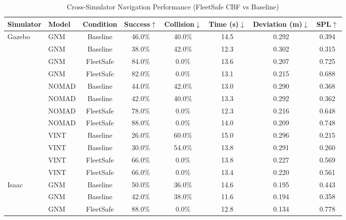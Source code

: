 \begin{table}[t]
\centering
\setlength{\tabcolsep}{4pt}
\caption{Cross-Simulator Navigation Performance (FleetSafe CBF vs Baseline)}
\label{tab:unified_benchmark}
\begin{tabular}{llcccccc}
\toprule
Simulator & Model & Condition & Success$\uparrow$ & Collision$\downarrow$ & Time (s)$\downarrow$ & Deviation (m)$\downarrow$ & SPL$\uparrow$ \\
\midrule
Gazebo & GNM & Baseline & 46.0\% & \textcolor{red!70!black}{40.0\%} & 14.5 & 0.292 & 0.394 \\
 & GNM & Baseline & 38.0\% & \textcolor{red!70!black}{42.0\%} & 12.3 & 0.302 & 0.315 \\
 & GNM & FleetSafe & \textcolor{green!60!black}{84.0\%} & \textcolor{green!60!black}{0.0\%} & 13.6 & 0.207 & 0.725 \\
\addlinespace
 & GNM & FleetSafe & \textcolor{green!60!black}{82.0\%} & \textcolor{green!60!black}{0.0\%} & 13.1 & 0.215 & 0.688 \\
\addlinespace
 & NOMAD & Baseline & 44.0\% & \textcolor{red!70!black}{42.0\%} & 13.0 & 0.290 & 0.368 \\
 & NOMAD & Baseline & 42.0\% & \textcolor{red!70!black}{40.0\%} & 13.3 & 0.292 & 0.362 \\
 & NOMAD & FleetSafe & \textcolor{green!60!black}{78.0\%} & \textcolor{green!60!black}{0.0\%} & 12.3 & 0.216 & 0.648 \\
\addlinespace
 & NOMAD & FleetSafe & \textcolor{green!60!black}{88.0\%} & \textcolor{green!60!black}{0.0\%} & 14.0 & 0.209 & 0.748 \\
\addlinespace
 & VINT & Baseline & 26.0\% & \textcolor{red!70!black}{60.0\%} & 15.0 & 0.296 & 0.215 \\
 & VINT & Baseline & 30.0\% & \textcolor{red!70!black}{54.0\%} & 13.8 & 0.291 & 0.260 \\
 & VINT & FleetSafe & \textcolor{green!60!black}{66.0\%} & \textcolor{green!60!black}{0.0\%} & 13.8 & 0.227 & 0.569 \\
\addlinespace
 & VINT & FleetSafe & \textcolor{green!60!black}{66.0\%} & \textcolor{green!60!black}{0.0\%} & 13.4 & 0.220 & 0.561 \\
\addlinespace
Isaac & GNM & Baseline & 50.0\% & \textcolor{red!70!black}{36.0\%} & 14.6 & 0.195 & 0.443 \\
 & GNM & Baseline & 42.0\% & \textcolor{red!70!black}{38.0\%} & 11.6 & 0.194 & 0.358 \\
 & GNM & FleetSafe & \textcolor{green!60!black}{88.0\%} & \textcolor{green!60!black}{0.0\%} & 12.8 & 0.134 & 0.778 \\

\end{tabular}
\end{table}
